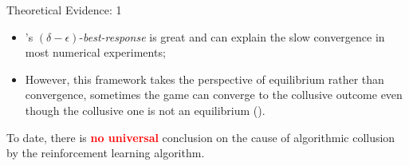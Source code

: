 \documentclass[8pt]{beamer}
\begin{document}
\begin{frame}{Theoretical Evidence: 1}
    \begin{itemize}
        \item \cite{den2022artificial}'s $(\delta-\epsilon)$-\textit{best-response} is great and can explain the slow convergence in most numerical experiments;
        \item However, this framework takes the perspective of equilibrium rather than convergence, sometimes the game can converge to the collusive outcome even though the collusive one is not an equilibrium (\cite{asker2023impact}).
    \end{itemize}
    \vspace{0.3cm}
    \begin{center}
        To date, there is \textcolor{red}{\textbf{no universal}} conclusion on the cause of algorithmic collusion by the reinforcement learning algorithm.
    \end{center}
\end{frame}
\end{document}

